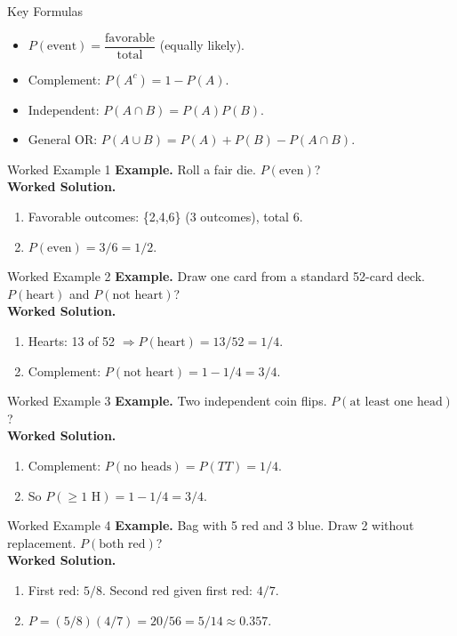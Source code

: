 \documentclass[aspectratio=169]{beamer}
\newcommand{\exampletitle}[1]{\vspace{0.25em}\textbf{Example.} #1\vspace{0.25em}}
\newcommand{\worked}{\textbf{Worked Solution.}}
\begin{document}
\begin{frame}{Key Formulas}
\begin{itemize}
  \item $P(\text{event})=\dfrac{\text{favorable}}{\text{total}}$ (equally likely).
  \item Complement: $P(A^c)=1-P(A)$.
  \item Independent: $P(A\cap B)=P(A)P(B)$.
  \item General OR: $P(A\cup B)=P(A)+P(B)-P(A\cap B)$.
\end{itemize}
\end{frame}

\begin{frame}{Worked Example 1}
\exampletitle{Roll a fair die. $P(\text{even})$?}\\[0.25em]
\worked
\begin{enumerate}
  \item Favorable outcomes: \{2,4,6\} (3 outcomes), total 6.
  \item $P(\text{even})=3/6=1/2$.
\end{enumerate}
\end{frame}

\begin{frame}{Worked Example 2}
\exampletitle{Draw one card from a standard 52-card deck. $P(\text{heart})$ and $P(\text{not heart})$?}\\[0.25em]
\worked
\begin{enumerate}
  \item Hearts: 13 of 52 $\Rightarrow P(\text{heart})=13/52=1/4$.
  \item Complement: $P(\text{not heart})=1-1/4=3/4$.
\end{enumerate}
\end{frame}

\begin{frame}{Worked Example 3}
\exampletitle{Two independent coin flips. $P(\text{at least one head})$?}\\[0.25em]
\worked
\begin{enumerate}
  \item Complement: $P(\text{no heads})=P(TT)=1/4$.
  \item So $P(\ge 1\text{ H})=1-1/4=3/4$.
\end{enumerate}
\end{frame}

\begin{frame}{Worked Example 4}
\exampletitle{Bag with 5 red and 3 blue. Draw 2 without replacement. $P(\text{both red})$?}\\[0.25em]
\worked
\begin{enumerate}
  \item First red: $5/8$. Second red given first red: $4/7$.
  \item $P= (5/8)(4/7)=20/56=5/14\approx0.357$.
\end{enumerate}
\end{frame}
\end{document}
